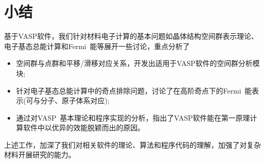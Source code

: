 \documentclass{article}      %
\begin{document}
\section{小结}
基于\textrm{VASP}软件，我们针对材料电子计算的基本问题如晶体结构空间群表示理论、电子基态总能计算和\textrm{Fermi~}能等展开一些讨论，重点分析了
\begin{itemize}
	\item 空间群与点群和平移/滑移对应关系，开发出适用于\textrm{VASP}软件的空间群分析模块;
	\item 针对电子基态总能计算中的奇点排除问题，讨论了在高阶奇点下的\textrm{Fermi~}能表示(可与分子、原子体系对应);~
	\item 通过对\textrm{VASP~}基本理论和程序实现的分析，指出了\textrm{VASP}软件能在第一原理计算软件中以优异的效能脱颖而出的原因。
\end{itemize}
上述工作，加深了我们对相关软件的理论、算法和程序代码的理解，加强了对复杂材料开展研究的能力。





\end{document}
